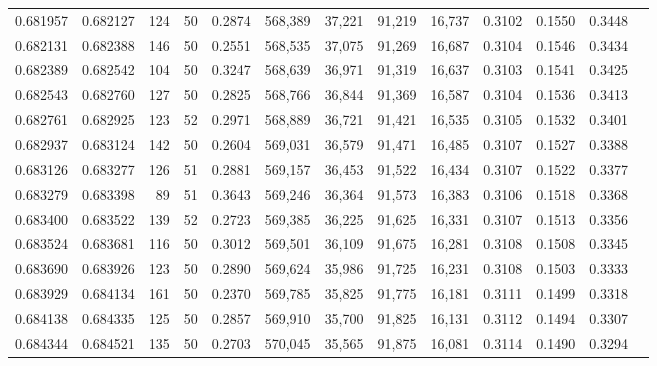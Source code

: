 \begin{tabular}{rrrrrrrrrrrrr}
0.681957 & 0.682127 &   124 &  50 &                                     0.2874 & 568,389 &  37,221 &  91,219 &  16,737 & 0.3102 & 0.1550 & 0.3448 \\
0.682131 & 0.682388 &   146 &  50 &                                     0.2551 & 568,535 &  37,075 &  91,269 &  16,687 & 0.3104 & 0.1546 & 0.3434 \\
0.682389 & 0.682542 &   104 &  50 &                                     0.3247 & 568,639 &  36,971 &  91,319 &  16,637 & 0.3103 & 0.1541 & 0.3425 \\
0.682543 & 0.682760 &   127 &  50 &                                     0.2825 & 568,766 &  36,844 &  91,369 &  16,587 & 0.3104 & 0.1536 & 0.3413 \\
0.682761 & 0.682925 &   123 &  52 &                                     0.2971 & 568,889 &  36,721 &  91,421 &  16,535 & 0.3105 & 0.1532 & 0.3401 \\
0.682937 & 0.683124 &   142 &  50 &                                     0.2604 & 569,031 &  36,579 &  91,471 &  16,485 & 0.3107 & 0.1527 & 0.3388 \\
0.683126 & 0.683277 &   126 &  51 &                                     0.2881 & 569,157 &  36,453 &  91,522 &  16,434 & 0.3107 & 0.1522 & 0.3377 \\
0.683279 & 0.683398 &    89 &  51 &                                     0.3643 & 569,246 &  36,364 &  91,573 &  16,383 & 0.3106 & 0.1518 & 0.3368 \\
0.683400 & 0.683522 &   139 &  52 &                                     0.2723 & 569,385 &  36,225 &  91,625 &  16,331 & 0.3107 & 0.1513 & 0.3356 \\
0.683524 & 0.683681 &   116 &  50 &                                     0.3012 & 569,501 &  36,109 &  91,675 &  16,281 & 0.3108 & 0.1508 & 0.3345 \\
0.683690 & 0.683926 &   123 &  50 &                                     0.2890 & 569,624 &  35,986 &  91,725 &  16,231 & 0.3108 & 0.1503 & 0.3333 \\
0.683929 & 0.684134 &   161 &  50 &                                     0.2370 & 569,785 &  35,825 &  91,775 &  16,181 & 0.3111 & 0.1499 & 0.3318 \\
0.684138 & 0.684335 &   125 &  50 &                                     0.2857 & 569,910 &  35,700 &  91,825 &  16,131 & 0.3112 & 0.1494 & 0.3307 \\
0.684344 & 0.684521 &   135 &  50 &                                     0.2703 & 570,045 &  35,565 &  91,875 &  16,081 & 0.3114 & 0.1490 & 0.3294 \\

\end{tabular}
